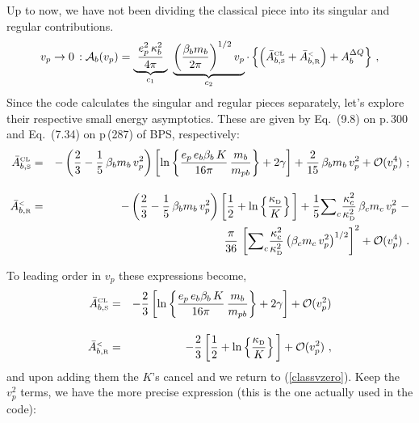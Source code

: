 \documentclass[preprint,12pt,eqsecnum,nofootinbib,amsmath,amssymb]{revtex4}
\newcommand{\smR}{{\rm\scriptscriptstyle R}}
\newcommand{\smS}{{\rm\scriptscriptstyle S}}
\newcommand{\smD}{{\rm\scriptscriptstyle D}}
\newcommand{\smCL}{{\rm\scriptscriptstyle CL}}
\newcommand{\smLT}{{\rm\scriptscriptstyle <}}
\begin{document}
Up to now, we have not been dividing the classical piece into its
singular and regular contributions. 
\begin{eqnarray}
  v_p \to 0 \,: 
  {\cal A}_b(v_p) 
  =  
  \underbrace{~
  \frac{e_p^2\,\kappa_b^2}{4\pi} 
  ~}_{c_1}
  ~
  \underbrace{
  \left( \frac{\beta_b m_b}{2\pi} \right)^{1/2} v_p 
  }_{c_2}
  \cdot
  \left\{ \Big(\bar A_{b,\smS}^\smCL + \bar A_{b,\smR}^\smLT \Big) 
  + 
  A_b^{\Delta Q} \right\} \,,
\label{lowagain}
\end{eqnarray}
Since the code calculates the singular and regular pieces separately,
let's explore their respective small energy asymptotics. These are
given by Eq.~(9.8) on p.\,300 and Eq.~(7.34) on p\,(287) of BPS,
respectively:
\begin{eqnarray}
  \bar A_{b,\smS}^\smCL
  &=&
  -\left(\frac{2}{3} - \frac{1}{5}\,\beta_b m_b\,v_p^2 \right)
  \left[\ln\left\{ \frac{e_p \,e_b \beta_b \, K}{16\pi}\,
  \frac{m_b}{m_{pb}}\right\} + 2 \gamma
  \right] 
  + 
  \frac{2}{15}\,\beta_b m_b \, v_p^2  
  +
  {\cal O}(v_p^4)\ ;
\label{classvzero_sing}
\\[10pt]
\nonumber
  \bar A_{b,\smR}^\smLT
  &=&
  -\left(\frac{2}{3} - \frac{1}{5}\,\beta_b m_b\, v_p^2 \right)
  \left[ \frac{1}{2} + \ln\left\{\frac{\kappa_\smD}{K} \right\}\, \right]
  +
  \frac{1}{5}{\sum}_c \frac{\kappa_c^2}{\kappa_\smD^2} \,
  \beta_c m_c\, v_p^2 ~   -
\\
  && \hskip5cm 
  \frac{\pi}{36}\, \left[ {\sum}_c \frac{\kappa_c^2}{\kappa_\smD^2} 
  \left( \beta_c m_c\,v_p^2\right)^{1/2} \right]^2
  + 
  {\cal O}(v_p^4) \ .
\label{classvzero_reg}
\\[5pt]
\end{eqnarray}
To leading order in $v_p$ these expressions become, 
\begin{eqnarray}
  \bar A_{b,\smS}^\smCL
  &=&
  -\frac{2}{3}
  \left[\ln\left\{ \frac{e_p \,e_b \beta_b \, K}{16\pi}\,
  \frac{m_b}{m_{pb}}\right\} + 2 \gamma \right] 
  +
  {\cal O}(v_p^2)
\label{classvzero_sing_lo}
\\[10pt]
  \bar A_{b,\smR}^\smLT
  &=&
  -\frac{2}{3}
  \left[ \frac{1}{2} + \ln\left\{\frac{\kappa_\smD}{K} \right\}\, \right]
  +  {\cal O}(v_p^2) \ ,
\label{classvzero_reg_lo}
\end{eqnarray}
and upon adding them the $K$'s cancel and we return to (\ref{classvzero}).
Keep the $v_p^2$ terms, we have the more precise expression (this is the one
actually used in the code):
\end{document}
